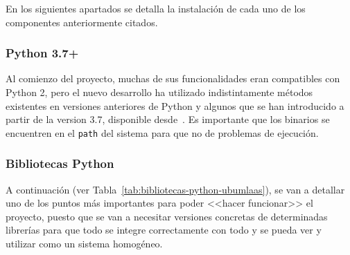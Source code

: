 En los siguientes apartados se detalla la instalación de cada uno de los componentes anteriormente citados.

\subsubsection{Python 3.7+}
Al comienzo del proyecto, muchas de sus funcionalidades eran compatibles con Python 2, pero el nuevo desarrollo ha utilizado indistintamente métodos existentes en versiones anteriores de Python y algunos que se han introducido a partir de la version 3.7, disponible desde~\cite{pythonGetIt}. Es importante que los binarios se encuentren en el \texttt{path} del sistema para que no de problemas de ejecución.

\subsubsection{Bibliotecas Python}
A continuación (ver Tabla~\ref{tab:bibliotecas-python-ubumlaas}), se van a detallar uno de los puntos más importantes para poder <<hacer funcionar>> el proyecto, puesto que se van a necesitar versiones concretas de determinadas librerías para que todo se integre correctamente con todo y se pueda ver y utilizar como un sistema homogéneo.

